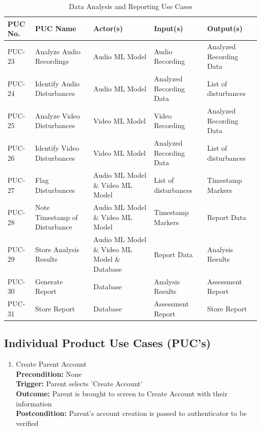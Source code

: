 \documentclass[12pt]{article}
\begin{document}
\begin{table}[H]
\centering
\caption{Data Analysis and Reporting Use Cases}
\label{tab:use_case_3}
\begin{tabular}{|p{2cm}|p{3.2cm}|p{3.2cm}|p{3cm}|p{3cm}|}
  \hline
  \textbf{PUC No.} & \textbf{PUC Name} & \textbf{Actor(s)} & \textbf{Input(s)} & \textbf{Output(s)} \\
  \hline
  PUC-23 & Analyze Audio Recordings & Audio ML Model & Audio Recording & Analyzed Recording Data \\  
  \hline
  PUC-24 & Identify Audio Disturbances & Audio ML Model & Analyzed Recording Data & List of disturbances \\  
  \hline
  PUC-25 & Analyze Video Disturbances & Video ML Model & Video Recording & Analyzed Recording Data \\  
  \hline
  PUC-26 & Identify Video Disturbances & Video ML Model & Analyzed Recording Data & List of disturbances \\  
  \hline
  PUC-27 & Flag Disturbances & Audio ML Model \& Video ML Model & List of disturbances & Timestamp Markers \\  
  \hline
  PUC-28 & Note Timestamp of Disturbance & Audio ML Model \& Video ML Model & Timestamp Markers & Report Data \\  
  \hline
  PUC-29 & Store Analysis Results & Audio ML Model \& Video ML Model \& Database & Report Data & Analysis Results \\  
  \hline
  PUC-30 & Generate Report & Database & Analysis Results & Assessment Report \\  
  \hline
  PUC-31 & Store Report & Database & Assessment Report & Store Report \\  
  \hline
\end{tabular}
\end{table}

\newpage

\subsection{Individual Product Use Cases (PUC's)}
\begin{enumerate}[label={PUC-}01. ]
  \item Create Parent Account\\
  \textbf{Precondition: }None\\
  \textbf{Trigger: }Parent selects 'Create Account'\\
  \textbf{Outcome: }Parent is brought to screen to Create Account with their information\\
  \textbf{Postcondition: } Parent's account creation is passed to authenticator to be verified\\
\end{enumerate}
\end{document}
